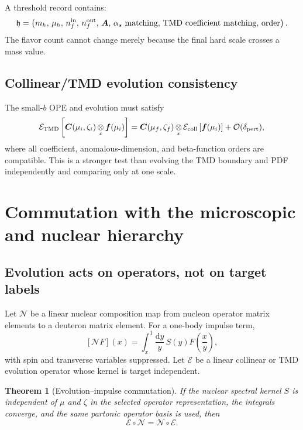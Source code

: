 \documentclass[11pt]{article}
\newtheorem{theorem}[definition]{Theorem}
\newcommand{\dd}{\mathrm{d}}
\newcommand{\TMD}{\mathrm{TMD}}
\newcommand{\cO}{\mathcal O}
\newcommand{\cE}{\mathcal E}
\newcommand{\cN}{\mathcal N}
\newcommand{\otimesx}{\mathop{\otimes}_{x}}
\begin{document}
A threshold record contains:
\begin{equation}
 \mathfrak h=
 \left(
 m_h,\,\mu_h,\,n_f^{\rm in},\,n_f^{\rm out},\,
 \bm A,\,\alpha_s\text{ matching},\,
 \TMD\text{ coefficient matching},\,
 \text{order}
 \right).
 \label{eq:threshold-record}
\end{equation}
The flavor count cannot change merely because the final hard scale crosses a
mass value.

\subsection{Collinear/TMD evolution consistency}

The small-\(b\) OPE and evolution must satisfy
\begin{equation}
 \cE_{\TMD}
 \left[
 \bm C(\mu_i,\zeta_i)\otimesx\bm f(\mu_i)
 \right]
 =
 \bm C(\mu_f,\zeta_f)
 \otimesx
 \cE_{\rm coll}\left[\bm f(\mu_i)\right]
 +\cO(\delta_{\rm pert}),
 \label{eq:ope-evolution-commutation}
\end{equation}
where all coefficient, anomalous-dimension, and beta-function orders are
compatible.  This is a stronger test than evolving the TMD boundary and PDF
independently and comparing only at one scale.

\section{Commutation with the microscopic and nuclear hierarchy}
\label{sec:nuclear-evolution}

\subsection{Evolution acts on operators, not on target labels}

Let \(\cN\) be a linear nuclear composition map from nucleon operator matrix
elements to a deuteron matrix element.  For a one-body impulse term,
\begin{equation}
 \left[\cN F\right](x)
 =\int_x^1\frac{\dd y}{y}\,
 S(y)F\left(\frac{x}{y}\right),
 \label{eq:nuclear-mellin-convolution}
\end{equation}
with spin and transverse variables suppressed.  Let \(\cE\) be a linear
collinear or TMD evolution operator whose kernel is target independent.

\begin{theorem}[Evolution--impulse commutation]
If the nuclear spectral kernel \(S\) is independent of \(\mu\) and \(\zeta\)
in the selected operator representation, the integrals converge, and the
same partonic operator basis is used, then
\begin{equation}
 \cE\circ\cN=\cN\circ\cE.
 \label{eq:evolution-nuclear-commutation}
\end{equation}
\end{theorem}
\end{document}
